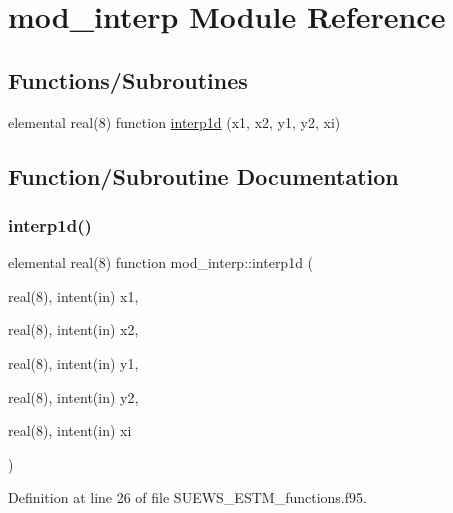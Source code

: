 \hypertarget{namespacemod__interp}{}\section{mod\+\_\+interp Module Reference}
\label{namespacemod__interp}
\subsection*{Functions/\+Subroutines}
\begin{DoxyCompactItemize}
\item 
elemental real(8) function \hyperlink{namespacemod__interp_aa2652ff1ded2f432b31108bd81c6dbd6}{interp1d} (x1, x2, y1, y2, xi)
\end{DoxyCompactItemize}


\subsection{Function/\+Subroutine Documentation}
\mbox{\label{namespacemod__interp_aa2652ff1ded2f432b31108bd81c6dbd6}} 
\subsubsection{\texorpdfstring{interp1d()}{interp1d()}}
{\footnotesize\ttfamily elemental real(8) function mod\+\_\+interp\+::interp1d (\begin{DoxyParamCaption}\item[{real(8), intent(in)}]{x1,  }\item[{real(8), intent(in)}]{x2,  }\item[{real(8), intent(in)}]{y1,  }\item[{real(8), intent(in)}]{y2,  }\item[{real(8), intent(in)}]{xi }\end{DoxyParamCaption})}



Definition at line 26 of file S\+U\+E\+W\+S\+\_\+\+E\+S\+T\+M\+\_\+functions.\+f95.

